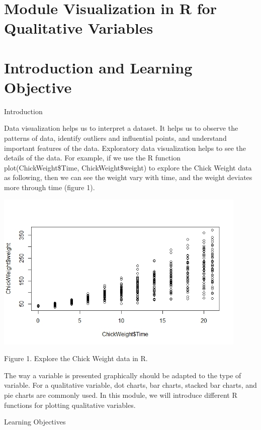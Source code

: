 \hypertarget{module-visualization-in-r-for-qualitative-variables}{%
\section{Module Visualization in R for Qualitative
Variables}\label{module-visualization-in-r-for-qualitative-variables}}

\hypertarget{introduction-and-learning-objective}{%
\section{Introduction and Learning
Objective}\label{introduction-and-learning-objective}}

Introduction

Data visualization helps us to interpret a dataset. It helps us to
observe the patterns of data, identify outliers and influential points,
and understand important features of the data. Exploratory data
visualization helps to see the details of the data. For example, if we
use the R function plot(ChickWeight\$Time, ChickWeight\$weight) to
explore the Chick Weight data as following, then we can see the weight
vary with time, and the weight deviates more through time (figure 1).

\includegraphics[width=4.74805in,height=3in]{media/image1.jpeg}

Figure 1. Explore the Chick Weight data in R.

The way a variable is presented graphically should be adapted to the
type of variable. For a qualitative variable, dot charts, bar charts,
stacked bar charts, and pie charts are commonly used. In this module, we
will introduce different R functions for plotting qualitative variables.

Learning Objectives

